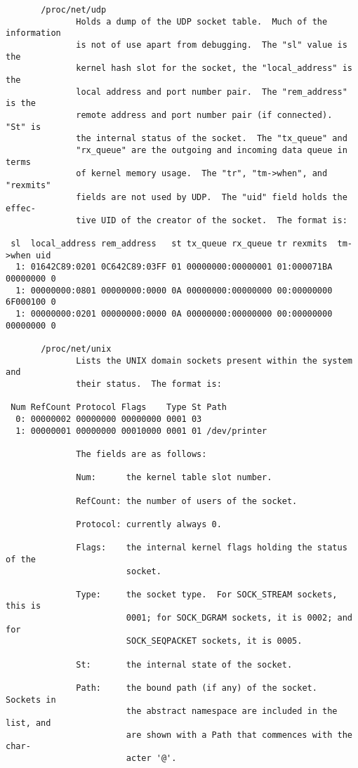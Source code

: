 \documentclass[]{article}
\begin{document}
\begin{verbatim}
       /proc/net/udp
              Holds a dump of the UDP socket table.  Much of the information
              is not of use apart from debugging.  The "sl" value is the
              kernel hash slot for the socket, the "local_address" is the
              local address and port number pair.  The "rem_address" is the
              remote address and port number pair (if connected).  "St" is
              the internal status of the socket.  The "tx_queue" and
              "rx_queue" are the outgoing and incoming data queue in terms
              of kernel memory usage.  The "tr", "tm->when", and "rexmits"
              fields are not used by UDP.  The "uid" field holds the effec‐
              tive UID of the creator of the socket.  The format is:

 sl  local_address rem_address   st tx_queue rx_queue tr rexmits  tm->when uid
  1: 01642C89:0201 0C642C89:03FF 01 00000000:00000001 01:000071BA 00000000 0
  1: 00000000:0801 00000000:0000 0A 00000000:00000000 00:00000000 6F000100 0
  1: 00000000:0201 00000000:0000 0A 00000000:00000000 00:00000000 00000000 0

       /proc/net/unix
              Lists the UNIX domain sockets present within the system and
              their status.  The format is:

 Num RefCount Protocol Flags    Type St Path
  0: 00000002 00000000 00000000 0001 03
  1: 00000001 00000000 00010000 0001 01 /dev/printer

              The fields are as follows:

              Num:      the kernel table slot number.

              RefCount: the number of users of the socket.

              Protocol: currently always 0.

              Flags:    the internal kernel flags holding the status of the
                        socket.

              Type:     the socket type.  For SOCK_STREAM sockets, this is
                        0001; for SOCK_DGRAM sockets, it is 0002; and for
                        SOCK_SEQPACKET sockets, it is 0005.

              St:       the internal state of the socket.

              Path:     the bound path (if any) of the socket.  Sockets in
                        the abstract namespace are included in the list, and
                        are shown with a Path that commences with the char‐
                        acter '@'.


\end{verbatim}
\end{document}
